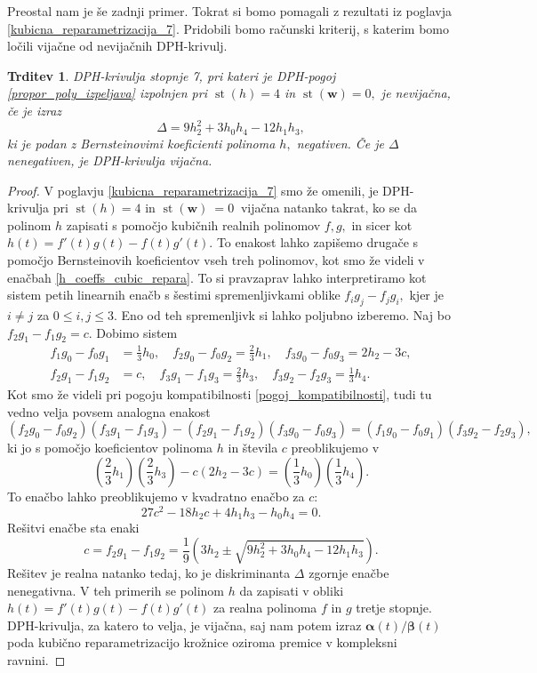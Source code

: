 \documentclass[12pt,a4paper,twoside]{article}
\theoremstyle{definition} %
\theoremstyle{plain} %
\newtheorem{trditev}[definicija]{Trditev}
\theoremstyle{primerstyle}
\numberwithin{equation}{section}  %
\newcommand{\wV}{\mathbf{w}}
\newcommand{\balpha}{\boldsymbol \alpha}
\newcommand{\bbeta}{\boldsymbol \beta}
\DeclareMathOperator{\st}{st}
\begin{document}
Preostal nam je še zadnji primer. Tokrat si bomo pomagali z rezultati iz poglavja \ref{kubicna_reparametrizacija_7}. Pridobili bomo računski kriterij, s katerim bomo ločili vijačne od nevijačnih DPH-krivulj.
\begin{trditev}
	\label{trditev_locevanje_h4w0}
	DPH-krivulja stopnje 7, pri kateri je DPH-pogoj \eqref{propor_poly_izpeljava} izpolnjen pri $\st(h)=4$ in $\st(\wV)=0,$ je nevijačna, če je izraz
	\begin{equation}
		\label{diskriminanta}
		\Delta=9h_2^2+3h_0h_4-12h_1h_3,
	\end{equation}
	ki je podan z Bernsteinovimi koeficienti polinoma $h,$ negativen. Če je $\Delta$ nenegativen, je DPH-krivulja vijačna.
\end{trditev}
\begin{proof}
	V poglavju \ref{kubicna_reparametrizacija_7} smo že omenili, je DPH-krivulja pri $\st(h)=4$ in $\st(\wV)~=0~$ vijačna natanko takrat, ko se da polinom $h$ zapisati s pomočjo kubičnih realnih polinomov $f,g,$ in sicer kot $h(t)=f'(t)g(t)-f(t)g'(t).$ To enakost lahko zapišemo drugače s pomočjo Bernsteinovih koeficientov vseh treh polinomov, kot smo že videli v enačbah \eqref{h_coeffs_cubic_repara}. To si pravzaprav lahko interpretiramo kot sistem petih linearnih enačb s šestimi spremenljivkami oblike $f_ig_j-f_jg_i,$ kjer je $i\neq j$ za $0\leq i,j\leq 3.$ Eno od teh spremenljivk si lahko poljubno izberemo. Naj bo $f_2g_1-f_1g_2=c.$ Dobimo sistem
	\begin{align*}
		f_1g_0-f_0g_1&=\frac{1}{3}h_0,\quad f_2g_0-f_0g_2=\frac{2}{3}h_1,\quad f_3g_0-f_0g_3=2h_2-3c,\\
		f_2g_1-f_1g_2&=c,\quad f_3g_1-f_1g_3=\frac{2}{3}h_3,\quad f_3g_2-f_2g_3=\frac{1}{3}h_4.
	\end{align*}
	Kot smo že videli pri pogoju kompatibilnosti \eqref{pogoj_kompatibilnosti}, tudi tu vedno velja povsem analogna enakost
	\begin{equation*}
		(f_2g_0-f_0g_2)(f_3g_1-f_1g_3)-(f_2g_1-f_1g_2)(f_3g_0-f_0g_3)=(f_1g_0-f_0g_1)(f_3g_2-f_2g_3),
	\end{equation*}
	ki jo s pomočjo koeficientov polinoma $h$ in števila $c$ preoblikujemo v
	\begin{equation*}
		\left(\frac{2}{3}h_1\right)\left(\frac{2}{3}h_3\right)-c(2h_2-3c)=\left(\frac{1}{3}h_0\right)\left(\frac{1}{3}h_4\right)\!.
	\end{equation*}
	To enačbo lahko preoblikujemo v kvadratno enačbo za $c$:
	\begin{equation*}
		27c^2-18h_2c+4h_1h_3-h_0h_4=0.
	\end{equation*}
	Rešitvi enačbe sta enaki
	\begin{equation*}
		c=f_2g_1-f_1g_2=\frac{1}{9}\left(3h_2\pm\sqrt{9h_2^2+3h_0h_4-12h_1h_3}\right)\!.
	\end{equation*}
	Rešitev je realna natanko tedaj, ko je diskriminanta $\Delta$ zgornje enačbe nenegativna. V teh primerih se polinom $h$ da zapisati v obliki $h(t)=f'(t)g(t)-f(t)g'(t)$ za realna polinoma $f$ in $g$ tretje stopnje. DPH-krivulja, za katero to velja, je vijačna, saj nam potem izraz $\balpha(t)/\bbeta(t)$ poda kubično reparametrizacijo krožnice oziroma premice v kompleksni ravnini.
	

\end{proof}
\end{document}
